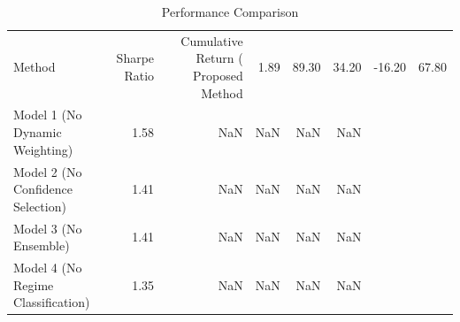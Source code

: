 \begin{table}
\caption{Performance Comparison}
\label{tab:comparison}
\begin{tabular}{lrrrrr}
\toprule
Method & Sharpe Ratio & Cumulative Return (%
\midrule
Proposed Method & 1.89 & 89.30 & 34.20 & -16.20 & 67.80 \\
Model 1 (No Dynamic Weighting) & 1.58 & NaN & NaN & NaN & NaN \\
Model 2 (No Confidence Selection) & 1.41 & NaN & NaN & NaN & NaN \\
Model 3 (No Ensemble) & 1.41 & NaN & NaN & NaN & NaN \\
Model 4 (No Regime Classification) & 1.35 & NaN & NaN & NaN & NaN \\
\bottomrule
\end{tabular}
\end{table}
